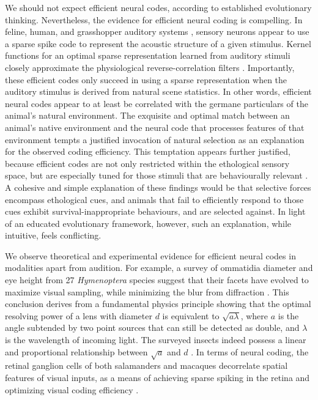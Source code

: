 \documentclass{article}
\begin{document}
We should not expect efficient neural codes, according to established evolutionary thinking. Nevertheless, the evidence for efficient neural coding is compelling. In feline, human, and grasshopper auditory systems \cite{Machens_Gollisch_Kolesnikova_Herz_2005, smith_lewicki_2006}, sensory neurons appear to use a sparse spike code to represent the acoustic structure of a given stimulus. Kernel functions for an optimal sparse representation learned from auditory stimuli closely approximate the physiological reverse-correlation filters \cite{smith_lewicki_2006}. Importantly, these efficient codes only succeed in using a sparse representation when the auditory stimulus is derived from natural scene statistics. In other words, efficient neural codes appear to at least be correlated with the germane particulars of the animal's natural environment. The exquisite and optimal match between an animal's native environment and the neural code that processes features of that environment tempts a justified invocation of natural selection as an explanation for the observed coding efficiency. This temptation appears further justified, because efficient codes are not only restricted within the ethological sensory space, but are especially tuned for those stimuli that are behaviourally relevant \cite{Machens_Gollisch_Kolesnikova_Herz_2005, machens_herz_2001}. A cohesive and simple explanation of these findings would be that selective forces encompass ethological cues, and animals that fail to efficiently respond to those cues exhibit survival-inappropriate behaviours, and are selected against. In light of an educated evolutionary framework, however, such an explanation, while intuitive, feels conflicting.

We observe theoretical and experimental evidence for efficient neural codes in modalities apart from audition. For example, a survey of ommatidia diameter and eye height from 27 \textit{Hymenoptera} species suggest that their facets have evolved to maximize visual sampling, while minimizing the blur from diffraction \cite{barlow_1952}. This conclusion derives from a fundamental physics principle showing that the optimal resolving power of a lens with diameter $d$ is equivalent to $\sqrt{a \lambda}$, where $a$ is the angle subtended by two point sources that can still be detected as double, and $\lambda$ is the wavelength of incoming light. The surveyed insects indeed possess a linear and proportional relationship between $\sqrt{a}$ and $d$ \cite{barlow_1952}. In terms of neural coding, the retinal ganglion cells of both salamanders and macaques decorrelate spatial features of visual inputs, as a means of achieving sparse spiking in the retina and optimizing visual coding efficiency \cite{Pitkow_Meister_2012}. 
\end{document}
